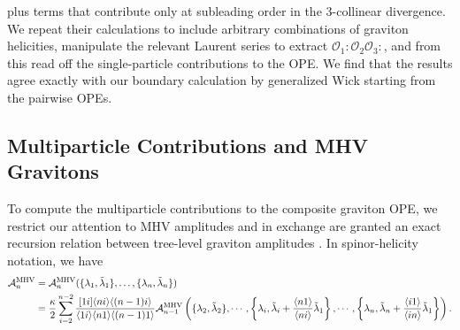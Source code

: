 \documentclass[11pt,letterpaper]{article}
\newcommand{\mc}[1]{\mathcal{#1}}
\begin{document}
plus terms that contribute only at subleading order in the 3-collinear divergence. We repeat their calculations to include arbitrary combinations of graviton helicities, manipulate the relevant Laurent series to extract $\mc{O}_1 :\mc{O}_2 \mc{O}_3:$, and from this read off the single-particle contributions to the OPE. We find that the results agree exactly with our boundary calculation by generalized Wick starting from the pairwise OPEs.




\subsection{Multiparticle Contributions and MHV Gravitons}
To compute the multiparticle contributions to the composite graviton OPE, we restrict our attention to MHV amplitudes and in exchange are granted an exact recursion relation between tree-level graviton amplitudes  \cite{Hodges:2011wm, Guevara:2019ypd}. In spinor-helicity notation, we have 
\begin{equation} \label{MHV-recursion}
     \begin{split}
         \mathcal{A}_{n }^{\mbox{\scriptsize{MHV}}} & = \mathcal{A}_{n }^{\mbox{\scriptsize{MHV}}}(\{\lambda_1, \tilde{\lambda}_1\}, \ldots, \{\lambda_n, \tilde{\lambda}_n\}) \\
         &= \frac{\kappa}{2} \sum_{i=2}^{n-2} \frac{[1i] \langle ni \rangle \langle (n-1)i \rangle}{\langle 1i\rangle\langle n1 \rangle \langle (n-1)1 \rangle} \mathcal{A}_{n-1}^{\rm MHV} \left(\{\lambda_2, \tilde {\lambda}_{2} \},  \cdots, \left \{ \lambda_i, \tilde \lambda_i +\frac{\langle n1 \rangle}{\langle ni \rangle} \tilde{\lambda}_1 \right\}, \cdots, \left\{ \lambda_n, \tilde \lambda_n +\frac{\langle i1 \rangle}{\langle in \rangle} \tilde{\lambda}_1 \right\} \right).
     \end{split}
\end{equation}
\end{document}
